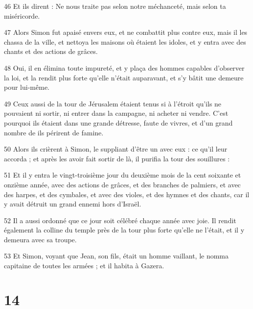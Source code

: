 \par 46 Et ils dirent : Ne nous traite pas selon notre méchanceté, mais selon ta miséricorde.
\par 47 Alors Simon fut apaisé envers eux, et ne combattit plus contre eux, mais il les chassa de la ville, et nettoya les maisons où étaient les idoles, et y entra avec des chants et des actions de grâces.
\par 48 Oui, il en élimina toute impureté, et y plaça des hommes capables d'observer la loi, et la rendit plus forte qu'elle n'était auparavant, et s'y bâtit une demeure pour lui-même.
\par 49 Ceux aussi de la tour de Jérusalem étaient tenus si à l'étroit qu'ils ne pouvaient ni sortir, ni entrer dans la campagne, ni acheter ni vendre. C'est pourquoi ils étaient dans une grande détresse, faute de vivres, et d'un grand nombre de ils périrent de famine.
\par 50 Alors ils crièrent à Simon, le suppliant d'être un avec eux : ce qu'il leur accorda ; et après les avoir fait sortir de là, il purifia la tour des souillures :
\par 51 Et il y entra le vingt-troisième jour du deuxième mois de la cent soixante et onzième année, avec des actions de grâces, et des branches de palmiers, et avec des harpes, et des cymbales, et avec des violes, et des hymnes et des chants, car il y avait détruit un grand ennemi hors d’Israël.
\par 52 Il a aussi ordonné que ce jour soit célébré chaque année avec joie. Il rendit également la colline du temple près de la tour plus forte qu'elle ne l'était, et il y demeura avec sa troupe.
\par 53 Et Simon, voyant que Jean, son fils, était un homme vaillant, le nomma capitaine de toutes les armées ; et il habita à Gazera.

\chapter{14}

